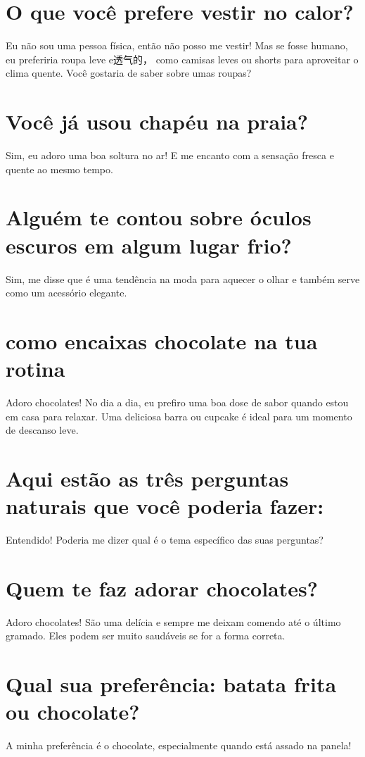 \documentclass[11pt,a4paper]{article}
\begin{document}
\section{O que você prefere vestir no calor?}
Eu não sou uma pessoa física, então não posso me vestir! Mas se fosse humano, eu preferiria roupa leve e透气的， como camisas leves ou shorts para aproveitar o clima quente. Você gostaria de saber sobre umas roupas?

\section{Você já usou chapéu na praia?}
Sim, eu adoro uma boa soltura no ar! E me encanto com a sensação fresca e quente ao mesmo tempo.

\section{Alguém te contou sobre óculos escuros em algum lugar frio?}
Sim, me disse que é uma tendência na moda para aquecer o olhar e também serve como um acessório elegante.

\section{como encaixas chocolate na tua rotina}
Adoro chocolates! No dia a dia, eu prefiro uma boa dose de sabor quando estou em casa para relaxar. Uma deliciosa barra ou cupcake é ideal para um momento de descanso leve.

\section{Aqui estão as três perguntas naturais que você poderia fazer:}
Entendido! Poderia me dizer qual é o tema específico das suas perguntas?

\section{Quem te faz adorar chocolates?}
Adoro chocolates! São uma delícia e sempre me deixam comendo até o último gramado. Eles podem ser muito saudáveis se for a forma correta.

\section{Qual sua preferência: batata frita ou chocolate?}
A minha preferência é o chocolate, especialmente quando está assado na panela!
\end{document}

